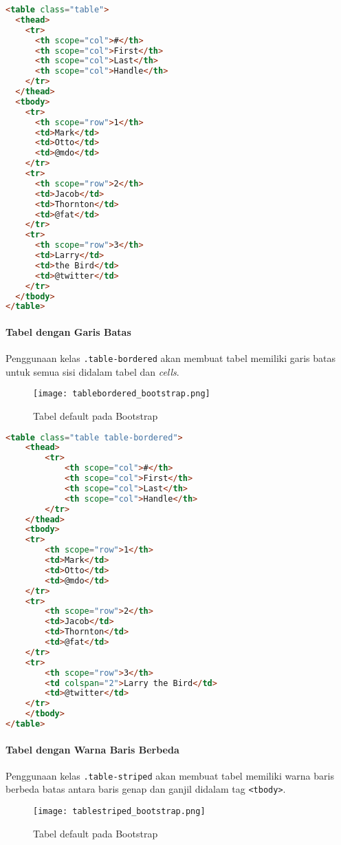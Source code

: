 \begin{itemize}
\begin{lstlisting}[language=HTML, frame=single, basicstyle=\small] 
<table class="table">
  <thead>
    <tr>
      <th scope="col">#</th>
      <th scope="col">First</th>
      <th scope="col">Last</th>
      <th scope="col">Handle</th>
    </tr>
  </thead>
  <tbody>
    <tr>
      <th scope="row">1</th>
      <td>Mark</td>
      <td>Otto</td>
      <td>@mdo</td>
    </tr>
    <tr>
      <th scope="row">2</th>
      <td>Jacob</td>
      <td>Thornton</td>
      <td>@fat</td>
    </tr>
    <tr>
      <th scope="row">3</th>
      <td>Larry</td>
      <td>the Bird</td>
      <td>@twitter</td>
    </tr>
  </tbody>
</table>
\end{lstlisting}

\paragraph{Tabel dengan Garis Batas}
Penggunaan kelas \texttt{.table-bordered} akan membuat tabel memiliki garis batas untuk semua sisi didalam tabel dan \textit{cells}.

\begin{figure} [H]
	\centering  
	\texttt{[image: tablebordered\_bootstrap.png]}  
	\caption{Tabel default pada Bootstrap} 
\end{figure}

\begin{lstlisting}[language=HTML, frame=single, basicstyle=\small] 
<table class="table table-bordered">
	<thead>
		<tr>
			<th scope="col">#</th>
			<th scope="col">First</th>
			<th scope="col">Last</th>
			<th scope="col">Handle</th>
		</tr>
	</thead>
	<tbody>
	<tr>
		<th scope="row">1</th>
		<td>Mark</td>
		<td>Otto</td>
		<td>@mdo</td>
	</tr>
	<tr>
		<th scope="row">2</th>
		<td>Jacob</td>
		<td>Thornton</td>
		<td>@fat</td>
	</tr>
	<tr>
		<th scope="row">3</th>
		<td colspan="2">Larry the Bird</td>
		<td>@twitter</td>
	</tr>
	</tbody>
</table>
\end{lstlisting}

\paragraph{Tabel dengan Warna Baris Berbeda}
Penggunaan kelas \texttt{.table-striped} akan membuat tabel memiliki warna baris berbeda batas antara baris genap dan ganjil didalam tag \texttt{<tbody>}.

\begin{figure} [H]
	\centering  
	\texttt{[image: tablestriped\_bootstrap.png]}  
	\caption{Tabel default pada Bootstrap} 
\end{figure}


\end{itemize}
